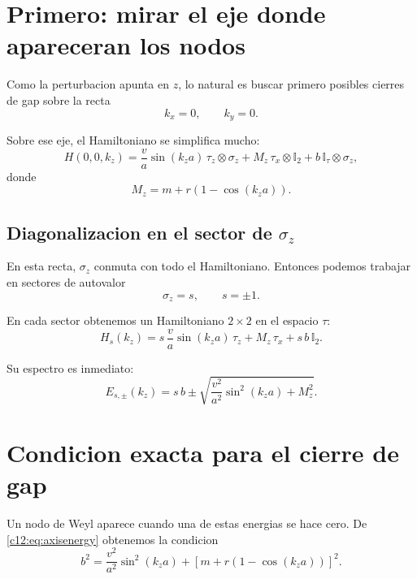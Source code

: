 \section{Primero: mirar el eje donde apareceran los nodos}
Como la perturbacion apunta en \(z\), lo natural es buscar primero posibles cierres de gap sobre la recta
\begin{equation}
k_x=0,\qquad k_y=0.
\end{equation}

Sobre ese eje, el Hamiltoniano se simplifica mucho:
\begin{equation}
H(0,0,k_z)=
\frac{v}{a}\sin(k_z a)\,\tau_z\otimes \sigma_z
+
M_z\,\tau_x\otimes \mathbb{I}_2
+
b\,\mathbb{I}_\tau\otimes \sigma_z,
\label{c12:eq:axis}
\end{equation}
donde
\begin{equation}
M_z = m + r\left(1-\cos(k_z a)\right).
\end{equation}

\subsection{\texorpdfstring{Diagonalizacion en el sector de \(\sigma_z\)}{Diagonalizacion en el sector de sigma_z}}
En esta recta, \(\sigma_z\) conmuta con todo el Hamiltoniano. Entonces podemos trabajar en sectores de autovalor
\begin{equation}
\sigma_z = s,
\qquad
s=\pm 1.
\end{equation}

En cada sector obtenemos un Hamiltoniano \(2\times 2\) en el espacio \(\tau\):
\begin{equation}
H_s(k_z)=
s\,\frac{v}{a}\sin(k_z a)\,\tau_z
+
M_z\,\tau_x
+
s\,b\,\mathbb{I}_2.
\label{c12:eq:Hs}
\end{equation}

Su espectro es inmediato:
\begin{equation}
E_{s,\pm}(k_z)=
s\,b
\pm
\sqrt{
\frac{v^2}{a^2}\sin^2(k_z a)+M_z^2
}.
\label{c12:eq:axisenergy}
\end{equation}

\section{Condicion exacta para el cierre de gap}
Un nodo de Weyl aparece cuando una de estas energias se hace cero. De \eqref{c12:eq:axisenergy} obtenemos la condicion
\begin{equation}
b^2=
\frac{v^2}{a^2}\sin^2(k_z a)
+
\left[m+r(1-\cos(k_z a))\right]^2.
\label{c12:eq:exactnode}
\end{equation}

